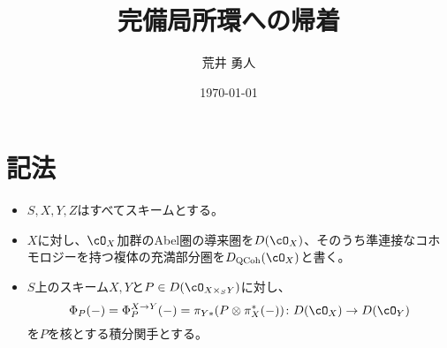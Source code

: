 \documentclass[uplatex, a4paper, dvipdfmx]{jsarticle}
\title{完備局所環への帰着}
\author{荒井 勇人}
\date{\today}
\theoremstyle{definition}
\DeclareMathOperator{\QCoh}{\mathrm{QCoh}}
\begin{document}
\maketitle
\section{記法}
\begin{itemize}
    \item $S, X, Y, Z$はすべてスキームとする。
    \item $X$に対し、$\cO_X$加群のAbel圏の導来圏を$D(\cO_X)$、そのうち準連接なコホモロジーを持つ複体の充満部分圏を$D_{\QCoh}(\cO_X)$と書く。
    \item $S$上のスキーム$X, Y$と$P \in D(\cO_{X \times_S Y})$に対し、$$\Phi_P(-) = \Phi_P^{X \to Y}(-) = \pi_{Y*}(P \otimes \pi_X^*(-)) \colon D(\cO_X) \to D(\cO_Y)$$を$P$を核とする積分関手とする。
\end{itemize}
\end{document}
